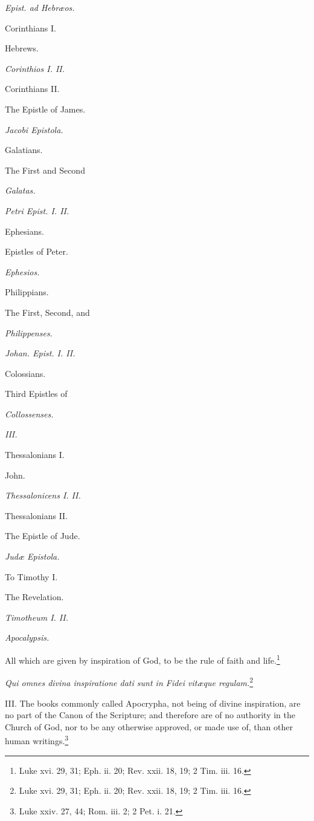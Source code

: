 \emph{Epist. ad Hebræos.}

Corinthians I.

Hebrews.

\emph{Corinthios I. II.}

Corinthians II.

The Epistle of James.

\emph{Jacobi Epistola.}

Galatians.

The First and Second

\emph{Galatas.}

\emph{Petri Epist. I. II.}

Ephesians.

Epistles of Peter.

\emph{Ephesios.}

Philippians.

The First, Second, and

\emph{Philippenses.}

\emph{Johan. Epist. I. II.}

Colossians.

Third Epistles of

\emph{Collossenses.}

\emph{III.}

Thessalonians I.

John.

\emph{Thessalonicens I. II.}

Thessalonians II.

The Epistle of Jude.

\emph{Judæ Epistola.}

To Timothy I.

The Revelation.

\emph{Timotheum I. II.}

\emph{Apocalypsis.}

All which are given by inspiration of God, to be the rule of faith and life.\footnote{Luke xvi. 29, 31; Eph. ii. 20;  Rev. xxii. 18, 19; 2 Tim. iii. 16.}

\emph{Qui omnes divina inspiratione dati sunt in Fidei vitæque regulam.}\footnote{Luke xvi. 29, 31; Eph. ii. 20;  Rev. xxii. 18, 19; 2 Tim. iii. 16.}

III. The books commonly called Apocrypha, not being of divine inspiration, are no part of the Canon of the Scripture; and therefore are of no authority in the Church of God, nor to be any otherwise approved, or made use of, than other human writings.\footnote{Luke xxiv. 27, 44; Rom. iii. 2; 2 Pet. i. 21.}

